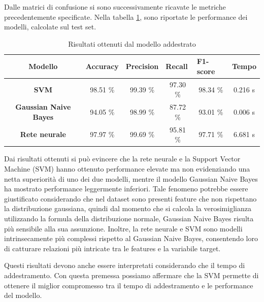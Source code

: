 Dalle matrici di confusione si sono successivamente ricavate le metriche
precedentemente specificate. Nella tabella \ref{tab:risultati}, sono riportate
le performance dei modelli, calcolate sul test set.
\begin{table}[!ht]
    \centering
    \begin{tabular}{@{}clllll@{}}
        \toprule
        \rowcolor[HTML]{EFEFEF}
        \textbf{Modello}                                      & \textbf{Accuracy}            & \textbf{Precision}           & \textbf{Recall}              & \textbf{F1-score}            & \textbf{Tempo}              \\ \midrule
        \cellcolor[HTML]{EFEFEF}\textbf{SVM}                  & \multicolumn{1}{c}{98.51 \%} & \multicolumn{1}{c}{99.39 \%} & \multicolumn{1}{c}{97.30 \%} & \multicolumn{1}{c}{98.34 \%} & \multicolumn{1}{c}{0.216 s} \\
        \cellcolor[HTML]{EFEFEF}\textbf{Gaussian Naive Bayes} & \multicolumn{1}{c}{94.05 \%} & \multicolumn{1}{c}{98.99 \%} & \multicolumn{1}{c}{87.72 \%} & \multicolumn{1}{c}{93.01 \%} & \multicolumn{1}{c}{0.006 s} \\
        \cellcolor[HTML]{EFEFEF}\textbf{Rete neurale}         & \multicolumn{1}{c}{97.97 \%} & \multicolumn{1}{c}{99.69 \%} & \multicolumn{1}{c}{95.81 \%} & \multicolumn{1}{c}{97.71 \%} & \multicolumn{1}{c}{6.681 s} \\ \bottomrule
    \end{tabular}
    \caption{Risultati ottenuti dal modello addestrato}
    \label{tab:risultati}
\end{table}

Dai risultati ottenuti si può evincere che la rete neurale e la Support Vector
Machine (SVM) hanno ottenuto performance elevate ma non evidenziando
una netta superiorità di uno dei due modelli, mentre il modello Gaussian
Naive Bayes ha mostrato performance leggermente inferiori. Tale fenomeno potrebbe
essere giustificato considerando che nel dataset sono presenti feature che non
rispettano la distribuzione gaussiana, quindi dal momento che si calcola la
verosimiglianza utilizzando la formula della distribuzione normale, Gaussian
Naive Bayes risulta più sensibile alla sua assunzione. Inoltre, la rete neurale
e SVM sono modelli intrinsecamente più complessi rispetto al Gaussian Naive
Bayes, consentendo loro di catturare relazioni più intricate tra le features e
la variabile target.

Questi risultati devono anche essere interpretati considerando che il tempo di
addestramento. Con questa premessa possiamo affermare che la SVM permette di
ottenere il miglior compromesso tra il tempo di addestramento e le performance
del modello.

